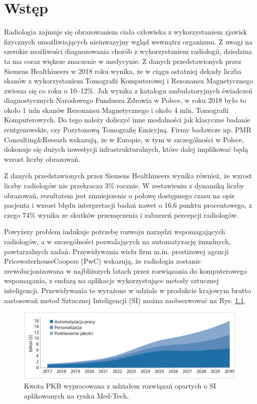 \chapter{Wstęp}

Radiologia zajmuje się obrazowaniem ciała człowieka z wykorzystaniem zjawisk fizycznych umożliwiających nieinwazyjny wgląd wewnątrz organizmu. Z uwagi na szerokie możliwości diagnozowania chorób z wykorzystaniem radiologii, dziedzina ta ma coraz większe znaczenie w medycynie. Z danych przedstawionych przez Siemens Healthineers w 2018 roku wynika, że w ciągu ostatniej dekady liczba skanów z wykorzystaniem Tomografii Komputerowej i Rezonansu Magnetycznego zwiesza się co roku o 10--12\%. Jak wynika z katalogu ambulatoryjnych świadczeń diagnostycznych Narodowego Funduszu Zdrowia w Polsce, w roku 2018 było to około 1 mln skanów Rezonansu Magnetycznego i około 4 mln. Tomografii Komputerowych. Do tego należy doliczyć inne modalności jak klasyczne badanie rentgenowskie, czy Pozytonową Tomografię Emisyjną. Firmy badawcze np. PMR Consulting\&Researh wskazują, że w Europie, w tym w szczególności w Polsce, dokonuje się dużych inwestycji infrastrukturalnych, które dalej implikować będą wzrost liczby obrazowań.
  
Z danych przedstawionych przez Siemens Healthineers wynika również, że wzrost liczby radiologów nie przekracza 3\% rocznie. W zestawieniu z dynamiką liczby obrazowań, rezultatem jest zmniejszenie o połowę dostępnego czasu na opis pacjenta i wzrost błędu interpretacji badań nawet o 16,6 punktu procentowego, z czego 74\% wynika ze skutków przemęczenia i zaburzeń percepcji radiologów.  


Powyższy problem indukuje potrzebę rozwoju narzędzi wspomagających radiologów, a w szczególności pozwalających na automatyzację żmudnych, powtarzalnych zadań. Przewidywania wielu firm m.in. prestiżowej agencji PricewaterhouseCoopers (PwC) wskazują, że radiologia zostanie zrewolucjonizowana w najbliższych latach przez rozwiązania do komputerowego wspomagania, z emfazą na aplikacje wykorzystujące metody sztucznej inteligencji. Przewidywania te wyrażone w udziale w produkcie krajowym brutto zastosowań metod Sztucznej Inteligencji (SI) można zaobserwować na Rys. \ref{MedTechGrowth}. 
\begin{figure}[h!]
	\centering
	\includegraphics[width=1.0\textwidth]{figures/AI_w_radiologii.jpg}
	\caption{Kwota PKB wypracowana z udziałem rozwiązań opartych o SI aplikowanych na rynku Med-Tech.}
	\label{MedTechGrowth}
\end{figure}

